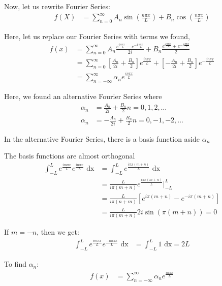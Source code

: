 \documentclass{article}
\begin{document}
Now, let us rewrite Fourier Series:
%
\begin{align}
  f(X) & = \sum^\infty_{n = 0} A_n \sin\left(\frac{n \pi x}{L}\right) + B_n \cos\left(\frac{n \pi x}{L}\right)
\end{align}

Here, let us replace our Fourier Series with terms we found,
%
\begin{align}
  f(x) & =
  \sum^\infty_{n = 0}
  A_n \frac
  {
    e^{i \frac{n \pi x}{L}} - e^{-i \frac{n \pi x}{L}}
  }
  {
    2 i
  }
  + B_n \frac
  {
    e^{i\frac{n \pi x}{L}} + e^{-i \frac{n \pi x}{L}}
  }
  {
    2
  }\\
  & =
  \sum^\infty_{n = 0}
  \left[
    \frac{A_n}{2i} + \frac{B_n}{2}
  \right]
  e^{\frac{i n \pi x}{L}}
  +
  \left[
    - \frac{A_n}{2i} + \frac{B_n}{2}
  \right]
  e^{- \frac{i n \pi x}{L}}\\
  & = \sum^\infty_{n = -\infty} \alpha_n e^{\frac{i n \pi x}{L}}
\end{align}

Here, we found an alternative Fourier Series where
%
\begin{align}
  \alpha_n & = \frac{A_n}{2i} + \frac{B_n}{2}  n = 0, 1, 2, \ldots\\
  \alpha_n & = -\frac{A_n}{2i} + \frac{B_n}{2} n = 0, -1, -2, \ldots
\end{align}

In the alternative Fourier Series, there is a basis function aside $\alpha_n$

The basis functions are almost orthogonal
%
\begin{align}
  \int^L_{-L}
  e^{\frac{i m \pi x}{L}} e^{\frac{i n \pi x}{L}} \text{ dx} & =
  \int^L_{-L}
  e^{\frac{i \pi x (m + n)}{L}} \text{ dx}\\
  & = \frac{L}{i \pi(m + n)} e^{\frac{i \pi x(m + n)}{L}} \Big|^L_{-L}\\
  & = \frac{L}{i \pi(n + m)} \left[ e^{i \pi(m + n)} - e^{-i \pi(m + n)} \right]\\
  & = \frac{L}{i \pi(m + n)} 2 i \sin(\pi(m + n)) = 0
\end{align}

If $m = -n$, then we get:
%
\begin{align}
  \int^L_{-L} e^{\frac{i m \pi x}{L}} e^{\frac{-i m \pi x}{L}} \text{ dx}
  & = \int^L_{-L} 1 \text{ dx} = 2L
\end{align}

To find $\alpha_n$:
%
\begin{align}
  f(x) & = \sum^\infty_{n = - \infty} \alpha_n e^{\frac{i n \pi x}{L}}
\end{align}
\end{document}
